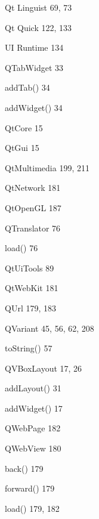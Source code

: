 \documentclass{book}
\renewcommand\subitem{\par}
\begin{document}
\begin{multicols}{2}
\begin{osp-index}
  \item Qt Linguist\hspace{1mm} 69, 73
  \item Qt Quick\hspace{1mm} 122, 133
    \subitem UI Runtime\hspace{1mm} 134
  \item QTabWidget\hspace{1mm} 33
    \subitem addTab()\hspace{1mm} 34
    \subitem addWidget()\hspace{1mm} 34
  \item QtCore\hspace{1mm} 15
  \item QtGui\hspace{1mm} 15
  \item QtMultimedia\hspace{1mm} 199, 211
  \item QtNetwork\hspace{1mm} 181
  \item QtOpenGL\hspace{1mm} 187
  \item QTranslator\hspace{1mm} 76
    \subitem load()\hspace{1mm} 76
  \item QtUiTools\hspace{1mm} 89
  \item QtWebKit\hspace{1mm} 181
  \item QUrl\hspace{1mm} 179, 183
  \item QVariant\hspace{1mm} 45, 56, 62, 208
    \subitem toString()\hspace{1mm} 57
  \item QVBoxLayout\hspace{1mm} 17, 26
    \subitem addLayout()\hspace{1mm} 31
    \subitem addWidget()\hspace{1mm} 17
  \item QWebPage\hspace{1mm} 182
  \item QWebView\hspace{1mm} 180
    \subitem back()\hspace{1mm} 179
    \subitem forward()\hspace{1mm} 179
    \subitem load()\hspace{1mm} 179, 182

\end{osp-index}
\end{multicols}
\end{document}
